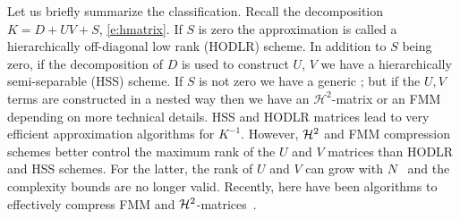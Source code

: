 Let us briefly summarize the \hmatrix{} classification. Recall the decomposition $K=D+UV+S$, \eqref{e:hmatrix}. If $S$ is zero the approximation is called a hierarchically off-diagonal low rank (HODLR) scheme.  In addition to $S$ being zero, if the \hmatrix{} decomposition of $D$ is used to construct $U$, $V$ we have a hierarchically semi-separable (HSS) scheme. If $S$ is not zero we have a generic \hmatrix{}; but if the $U,V$ terms are constructed in a nested way then we have an $\mathcal{H}^2$-matrix or an FMM depending on more technical details.  HSS and HODLR matrices lead to very efficient approximation algorithms for $K^{-1}$. However, ${\mathcal H}^2$ and FMM compression schemes better control the maximum rank of the $U$ and $V$ matrices  than HODLR and HSS schemes. For the latter, the rank of $U$ and $V$ can grow with $N$~\cite{chandrasekaran-gu-e10} and the complexity bounds are no longer valid. Recently, here have been algorithms to effectively compress FMM and ${\mathcal H}^2$-matrices~\cite{coulier-pouransari-darve16,yokota-ibeid-keyes16}. 
%
